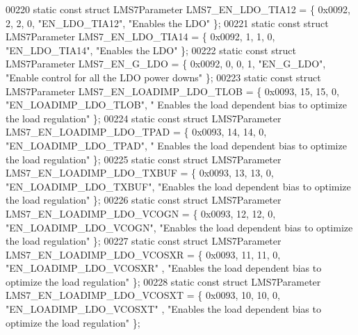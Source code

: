 \begin{DoxyCode}
00220 \textcolor{keyword}{static} \textcolor{keyword}{const} \textcolor{keyword}{struct }LMS7Parameter LMS7_EN_LDO_TIA12 = \{ 0x0092, 2, 2, 0, \textcolor{stringliteral}{"EN\_LDO\_TIA12"}, \textcolor{stringliteral}{"Enables the LDO"} 
      \};
00221 \textcolor{keyword}{static} \textcolor{keyword}{const} \textcolor{keyword}{struct }LMS7Parameter LMS7_EN_LDO_TIA14 = \{ 0x0092, 1, 1, 0, \textcolor{stringliteral}{"EN\_LDO\_TIA14"}, \textcolor{stringliteral}{"Enables the LDO"} 
      \};
00222 \textcolor{keyword}{static} \textcolor{keyword}{const} \textcolor{keyword}{struct }LMS7Parameter LMS7_EN_G_LDO = \{ 0x0092, 0, 0, 1, \textcolor{stringliteral}{"EN\_G\_LDO"}, \textcolor{stringliteral}{"Enable control for all
       the LDO power downs"} \};
00223 \textcolor{keyword}{static} \textcolor{keyword}{const} \textcolor{keyword}{struct }LMS7Parameter LMS7_EN_LOADIMP_LDO_TLOB = \{ 0x0093, 15, 15, 0, \textcolor{stringliteral}{"EN\_LOADIMP\_LDO\_TLOB"}, \textcolor{stringliteral}{"
      Enables the load dependent bias to optimize the load regulation"} \};
00224 \textcolor{keyword}{static} \textcolor{keyword}{const} \textcolor{keyword}{struct }LMS7Parameter LMS7_EN_LOADIMP_LDO_TPAD = \{ 0x0093, 14, 14, 0, \textcolor{stringliteral}{"EN\_LOADIMP\_LDO\_TPAD"}, \textcolor{stringliteral}{"
      Enables the load dependent bias to optimize the load regulation"} \};
00225 \textcolor{keyword}{static} \textcolor{keyword}{const} \textcolor{keyword}{struct }LMS7Parameter LMS7_EN_LOADIMP_LDO_TXBUF = \{ 0x0093, 13, 13, 0, \textcolor{stringliteral}{"EN\_LOADIMP\_LDO\_TXBUF"}, \textcolor{stringliteral}{
      "Enables the load dependent bias to optimize the load regulation"} \};
00226 \textcolor{keyword}{static} \textcolor{keyword}{const} \textcolor{keyword}{struct }LMS7Parameter LMS7_EN_LOADIMP_LDO_VCOGN = \{ 0x0093, 12, 12, 0, \textcolor{stringliteral}{"EN\_LOADIMP\_LDO\_VCOGN"}, \textcolor{stringliteral}{
      "Enables the load dependent bias to optimize the load regulation"} \};
00227 \textcolor{keyword}{static} \textcolor{keyword}{const} \textcolor{keyword}{struct }LMS7Parameter LMS7_EN_LOADIMP_LDO_VCOSXR = \{ 0x0093, 11, 11, 0, \textcolor{stringliteral}{"EN\_LOADIMP\_LDO\_VCOSXR"}
      , \textcolor{stringliteral}{"Enables the load dependent bias to optimize the load regulation"} \};
00228 \textcolor{keyword}{static} \textcolor{keyword}{const} \textcolor{keyword}{struct }LMS7Parameter LMS7_EN_LOADIMP_LDO_VCOSXT = \{ 0x0093, 10, 10, 0, \textcolor{stringliteral}{"EN\_LOADIMP\_LDO\_VCOSXT"}
      , \textcolor{stringliteral}{"Enables the load dependent bias to optimize the load regulation"} \};

\end{DoxyCode}
